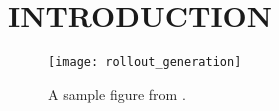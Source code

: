 
\section{INTRODUCTION}

\lipsum[1-3]

\begin{figure}[!t]
    \centering
    \texttt{[image: rollout\_generation]}
    \caption
    {
        A sample figure from \cite{narksri_occlusion-aware_2022}.
    }
\end{figure}
